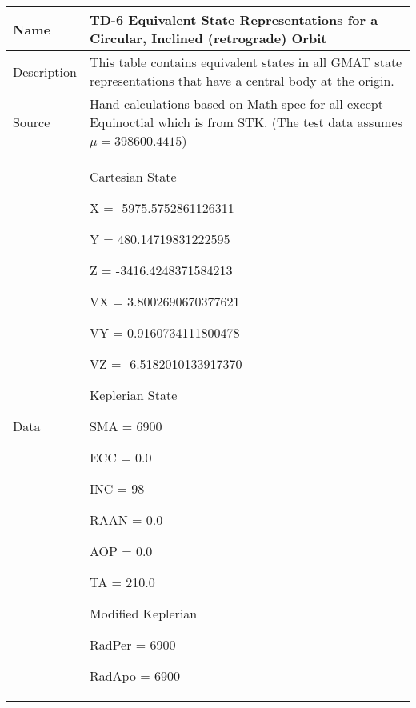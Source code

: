\begin{table}[htbp!]
\centering
      \begin{tabular}{|p{1.0 in} |p{5.0 in} |}
         \hline
          \rowcolor[rgb]{0.8,0.8,0.8}  Name & TD-6 Equivalent State Representations for a Circular, Inclined (retrograde) Orbit\\
         \hline
         Description & This table contains equivalent states in all GMAT state representations
         that have a central body at the origin.    \\ \hline
         Source &  Hand calculations based on Math spec for all except Equinoctial which is from STK.   (The test data assumes $\mu = 398600.4415$)\\
         \hline
         Data &
          \begin{compactenum}
              \item Cartesian State
              \begin{compactenum}
                  \item X = -5975.5752861126311
                  \item Y = 480.14719831222595
                  \item Z = -3416.4248371584213
                  \item VX = 3.8002690670377621
                  \item VY = 0.9160734111800478
                  \item VZ = -6.5182010133917370
              \end{compactenum}
              \item Keplerian State
              \begin{compactenum}
                  \item SMA = 6900
                  \item ECC = 0.0
                  \item INC = 98
                  \item RAAN = 0.0
                  \item AOP = 0.0
                  \item TA = 210.0
              \end{compactenum}
              \item Modified Keplerian
               \begin{compactenum}
                  \item RadPer = 6900
                  \item RadApo = 6900

\end{compactenum}
\end{compactenum}
\end{tabular}
\end{table}
